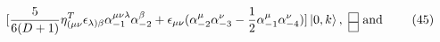 \begin{equation}
\lbrack \frac{5}{6(D+1)}\eta _{(\mu \nu }^{T}\epsilon _{\lambda )\beta
}\alpha _{-1}^{\mu \nu \lambda }\alpha _{-2}^{\beta }+\epsilon _{\mu \nu
}(\alpha _{-2}^{\mu }\alpha _{-3}^{\nu }-\frac{1}{2}\alpha _{-1}^{\mu
}\alpha _{-4}^{\nu })]\left\vert 0,k\right\rangle ,\text{ }%
\raisebox{0.06in}{\fbox{\rule[0.04cm]{0.04cm}{0cm}}}\hspace{-0.094in}\hspace{%
-0.04cm}\raisebox{-.047in}{\fbox{\rule[0.04cm]{0.04cm}{0cm}}}\text{\ and } 
\tag{45}
\end{equation}

